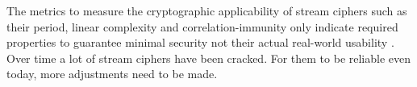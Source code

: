 The metrics to measure the cryptographic applicability of stream ciphers such as their period, linear complexity and correlation-immunity only indicate required properties to guarantee minimal security not their actual real-world usability \cite[p. 24]{coppersmith1993shrinking}. Over time a lot of stream ciphers have been cracked. For them to be reliable even today, more adjustments need to be made.

\clearpage

